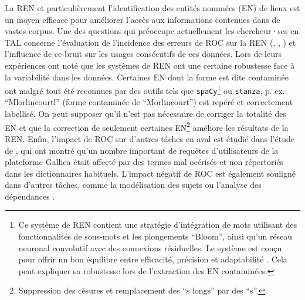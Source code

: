 La REN et particulièrement l’identification des entités nommées (EN) de lieux \cite{vanStrien-2020} est un moyen efficace pour améliorer l’accès aux informations contenues dans de vastes corpus. Une des questions qui préoccupe actuellement les chercheur·ses en TAL concerne l’évaluation de l’incidence des erreurs de ROC sur la REN (\cite{chiron:hal-03025508}, \cite{hamdi:hal-03026931}, \cite{DBLP:journals/corr/abs-2302-10204}) et l’influence de ce bruit sur les usages consécutifs \cite{vanStrien-2020} de ces données. Lors de leurs expériences \cite{DBLP:conf/gis/Koudoro-Parfait21} %
ont noté que les systèmes de REN ont une certaine robustesse face à la variabilité dans les données. Certaines EN dont la forme est dite \og{}contaminée\fg{} \cite{hamdi:hal-03615997} ont malgré tout été reconnues par des outils tels que \texttt{spaCy}\footnote{Ce système de REN contient une stratégie d'intégration de mots utilisant des fonctionnalités de sous-mots et les plongements ``Bloom'', ainsi qu'un réseau neuronal convolutif avec des connexions résiduelles. Le système est conçu pour offrir un bon équilibre entre efficacité, précision et adaptabilité \cite{bhavani}. Cela peut expliquer sa robustesse lors de l'extraction des EN contaminées.} ou \texttt{stanza}, p. ex. “Mlorlincourtl” (forme contaminée de “Morlincourt”)  est repéré et correctement labellisé. On peut supposer qu'il n'est pas nécessaire de corriger la totalité des EN et que la correction de seulement certaines EN\footnote{Suppression des césures et remplacement des ``s longs'' par des ``s''.} \cite{DBLP:conf/konvens/AlexGKT12} améliore les résultats de la REN. Enfin, l'impact de ROC sur d'autres tâches en aval est étudié dans l'étude de \cite{chiron:hal-03025508}, qui ont montré qu'un nombre important de requêtes d'utilisateurs de la plateforme Gallica était affecté par des termes mal océrisés et non répertoriés dans les dictionnaires habituels. L'impact négatif de ROC est également souligné dans d'autres tâches, comme la modélisation des sujets ou l'analyse des dépendances \cite{vanStrien-2020}. 



